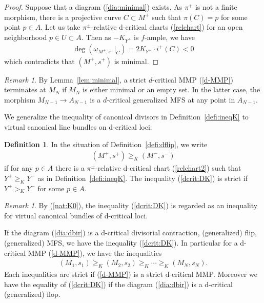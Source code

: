\documentclass[11pt]{amsart}
\theoremstyle{plain}
\theoremstyle{definition}
\newtheorem{defi}[thm]{Definition}
\theoremstyle{remark}
\newtheorem{rmk}[thm]{Remark}
\begin{document}
\begin{proof}
Suppose that a diagram (\ref{dia:minimal}) exists. 
As $\pi^+$ is not a finite morphism, there is a projective curve 
$C \subset M^+$
such that $\pi(C)=p$ for some point $p \in A$. 
Let us take $\pi^{\pm}$-relative
d-critical charts (\ref{relchart})
for an open neighborhood $p \in U \subset A$.  
Then as $-K_{Y^+}$ is $f$-ample, 
we have 
\begin{align*}
\deg(\omega_{M^+, s^+}|_{C})=2K_{Y^+} \cdot i^+(C)<0
\end{align*}
which contradicts that $(M^+, s^+)$ is minimal. 
\end{proof}

\begin{rmk}\label{rmk:mmp}
By Lemma~\ref{lem:minimal},
a strict $d$-critical MMP (\ref{d-MMP}) 
terminates at $M_N$ if 
$M_N$ is either minimal or an empty set. 
In the latter case, 
the morphism 
$M_{N-1} \to A_{N-1}$ is a $d$-critical generalized MFS
at any point in $A_{N-1}$. 
\end{rmk}

We
generalize the inequality of 
canonical divisors in 
Definition~\ref{defi:ineqK} to 
virtual canonical line bundles on 
d-critical loci: 
\begin{defi}\label{defi:dcrit:K}
In the situation of Definition~\ref{defi:dflip}, we write
\begin{align}\label{dcrit:DK}
(M^{+}, s^{+}) \ge_{K} (M^{-}, s^{-})
\end{align}
if for any $p \in A$ there is a 
$\pi^{\pm}$-relative d-critical chart 
(\ref{relchart2})
such that 
$Y^{+} \ge_K Y^{-}$ as in Definition~\ref{defi:ineqK}. 
The inequality (\ref{dcrit:DK}) is strict if 
$Y^+ >_K Y^-$ for some $p \in A$. 
\end{defi}
\begin{rmk}\label{rmk:ineq:d}
By (\ref{nat:K0}), the inequality (\ref{dcrit:DK}) is
regarded as an inequality for virtual
canonical bundles of d-critical loci. 
\end{rmk}

If the diagram (\ref{dia:dbir})
is a d-critical divisorial contraction, (generalized) flip, 
(generalized) MFS, we have the inequality 
(\ref{dcrit:DK}). 
In particular for a d-critical MMP (\ref{d-MMP}),
we have the inequalities
\begin{align*}
(M_1 , s_1) \ge_K (M_2, s_2) \ge_K \cdots 
\ge_K (M_N, s_N).
\end{align*} 
Each inequalities are strict if (\ref{d-MMP}) is a strict d-critical MMP. 
Moreover we have the equality 
of (\ref{dcrit:DK}) 
if the diagram (\ref{dia:dbir}) is a d-critical (generalized) flop.
\end{document}
